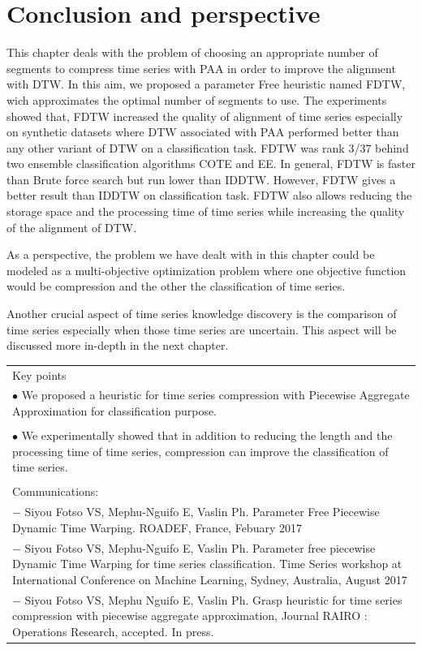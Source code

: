 \section{Conclusion and perspective}
\label{sec:5}
This chapter deals with the problem of choosing an appropriate number of segments to compress time series with PAA in order to improve the alignment with DTW. In this aim, we proposed a parameter Free heuristic named FDTW, wich approximates the optimal number of segments to use. The experiments showed that,  FDTW increased the quality of alignment of time series especially on synthetic datasets where DTW associated with PAA performed better than any other variant of DTW on a classification task. FDTW was rank 3/37 behind two ensemble classification algorithms COTE and EE. In general, FDTW is faster than Brute force search but run lower than IDDTW. However, FDTW gives a better result than IDDTW on classification task. FDTW also allows reducing the storage space and the processing time of time series while increasing the quality of the alignment of DTW.


 As a perspective, the problem we have dealt with in this chapter could be modeled as a multi-objective optimization problem where one objective function would be compression and the other the classification of time series. 
 
 
Another crucial aspect of time series knowledge discovery is the comparison of time series especially when those time series are uncertain. This aspect will be discussed more in-depth in the next chapter.




\begin{table}[ht]
\centering
\begin{tabular}{|p{15cm}|}

\hline
\rowcolor{LavenderBlush}
Key points\\
$\bullet$ We proposed a heuristic for time series compression with Piecewise Aggregate  Approximation for classification purpose. \\
\\
$\bullet$ We experimentally showed that in addition to reducing the length and the   processing time of time series, compression can improve the classification of   time series. 
\\
\\
Communications:\\
$-$ Siyou Fotso VS, Mephu-Nguifo E, Vaslin Ph. Parameter Free Piecewise Dynamic  Time Warping. ROADEF, France, Febuary 2017\\
$-$  Siyou Fotso VS, Mephu-Nguifo E, Vaslin Ph. Parameter free piecewise Dynamic Time Warping for time series classification. Time Series workshop at International Conference on Machine Learning, Sydney, Australia, August 2017\\
$-$ Siyou Fotso VS, Mephu Nguifo E, Vaslin Ph. Grasp heuristic for time series compression with piecewise aggregate approximation, Journal RAIRO : Operations Research, accepted. In press.\\
\hline
\end{tabular}
\end{table}